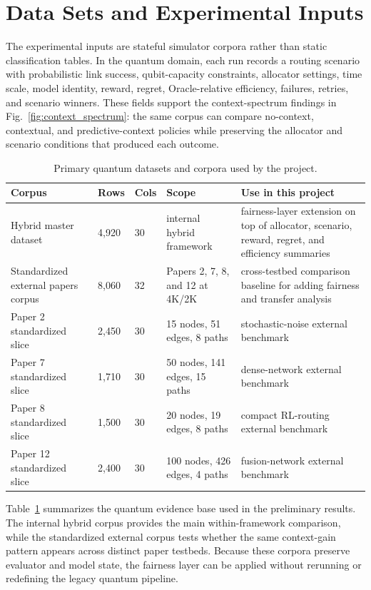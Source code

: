 \documentclass[conference]{IEEEtran}
\begin{document}
\section{Data Sets and Experimental Inputs}
The experimental inputs are stateful simulator corpora rather than static
classification tables. In the quantum domain, each run records a routing
scenario with probabilistic link success, qubit-capacity constraints,
allocator settings, time scale, model identity, reward, regret,
Oracle-relative efficiency, failures, retries, and scenario winners. These
fields support the context-spectrum findings in
Fig.~\ref{fig:context_spectrum}: the same corpus can compare no-context,
contextual, and predictive-context policies while preserving the allocator and
scenario conditions that produced each outcome.

\begin{table}[t]
\caption{Primary quantum datasets and corpora used by the project.}
\label{tab:datasets}
\centering
\small
\begin{tabular}{p{}p{}p{}p{}p{}}
\toprule
\textbf{Corpus} & \textbf{Rows} & \textbf{Cols} & \textbf{Scope} & \textbf{Use in this project} \\
\midrule
Hybrid master dataset & 4,920 & 30 & internal hybrid framework & fairness-layer extension on top of allocator, scenario, reward, regret, and efficiency summaries \\
Standardized external papers corpus & 8,060 & 32 & Papers 2, 7, 8, and 12 at 4K/2K & cross-testbed comparison baseline for adding fairness and transfer analysis \\
Paper 2 standardized slice & 2,450 & 30 & 15 nodes, 51 edges, 8 paths & stochastic-noise external benchmark \\
Paper 7 standardized slice & 1,710 & 30 & 50 nodes, 141 edges, 15 paths & dense-network external benchmark \\
Paper 8 standardized slice & 1,500 & 30 & 20 nodes, 19 edges, 8 paths & compact RL-routing external benchmark \\
Paper 12 standardized slice & 2,400 & 30 & 100 nodes, 426 edges, 4 paths & fusion-network external benchmark \\
\bottomrule
\end{tabular}
\end{table}

Table~\ref{tab:datasets} summarizes the quantum evidence base used in the
preliminary results. The internal hybrid corpus provides the main
within-framework comparison, while the standardized external corpus tests
whether the same context-gain pattern appears across distinct paper testbeds.
Because these corpora preserve evaluator and model state, the fairness layer
can be applied without rerunning or redefining the legacy quantum pipeline.
\end{document}
